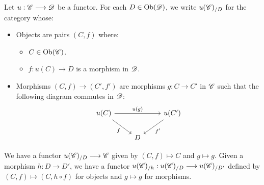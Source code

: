 \documentclass[11pt]{amsart}
\begin{document}
\begin{cns}\label{cns:rel-over-cat}
Let $u : \sC \to \sD$ be a functor.
For each $D \in \Ob{\sD}$, we write $u(\mathscr{C})_{/D}$ for the category whose:
\begin{itemize}
\item Objects are pairs $(C, f)$ where:
    \begin{itemize}
    \item $C \in \Ob{\sC}$.
    \item $f : u(C) \to D$ is a morphism in $\mathscr{D}$.
    \end{itemize}
\item Morphisms $(C, f) \to (C', f')$ are morphisms $g : C \to C'$ in $\mathscr{C}$
such that the following diagram commutes in $\mathscr{D}$:
\[\begin{tikzcd}
u(C) \ar[rd, "f" below left] \ar[rr, "u(g)"] & & u(C') \ar[ld, "f'" below right] \\
& D &
\end{tikzcd}\]
\end{itemize}
We have a functor $u(\sC)_{/D} \to \sC$ given by $(C, f) \mapsto C$ and $g \mapsto g$.
Given a morphism $h : D \to D'$, we have a functor $u(\sC)_{/h} : u(\sC)_{/D} \to u(\sC)_{/D'}$
defined by $(C, f) \mapsto (C, h \circ f)$ for objects and $g \mapsto g$ for morphisms.
\end{cns}
\end{document}
